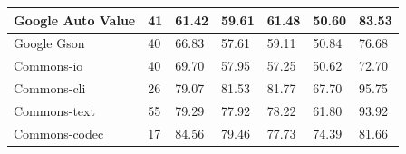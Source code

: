 \documentclass[conference,draftclsnofoot,onecolumn]{IEEEtran}
\begin{document}
\begin{table}[ht]
\begin{tabular}{|l|l|l|l|l|l|l|}
Google Auto   Value   & 41                   & 61.42                           & 59.61                                                & 61.48                            & 50.60                                                                                                                                    & 83.53                                                                                                                                    \\ \hline
Google Gson           & 40                   & 66.83                           & 57.61                                                & 59.11                            & 50.84                                                                                                                                    & 76.68                                                                                                                                    \\ \hline
Commons-io            & 40                   & 69.70                           & 57.95                                                & 57.25                            & 50.62                                                                                                                                    & 72.70                                                                                                                                    \\ \hline
Commons-cli           & 26                   & 79.07                           & 81.53                                                & 81.77                            & 67.70                                                                                                                                    & 95.75                                                                                                                                    \\ \hline
Commons-text          & 55                   & 79.29                           & 77.92                                                & 78.22                            & 61.80                                                                                                                                    & 93.92                                                                                                                                    \\ \hline
Commons-codec         & 17                   & 84.56                           & 79.46                                                & 77.73                            & 74.39                                                                                                                                    & 81.66                                                                                                                                    \\ \hline

\end{tabular}
\end{table}
\end{document}
